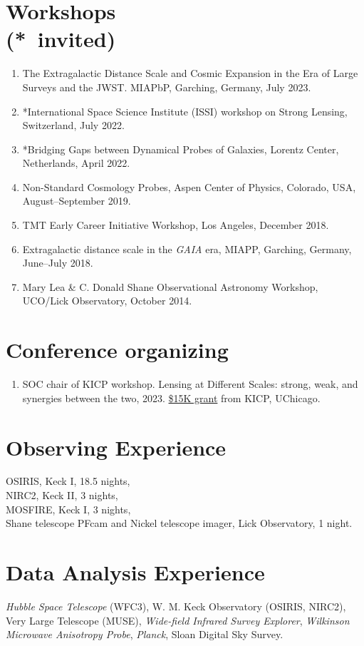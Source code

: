 \documentclass[margin, line]{res}
\begin{document}
\begin{resume}
\section{\sc Workshops \\ ({*}\ invited)}
\begin{enumerate}
	\item The Extragalactic Distance Scale and Cosmic Expansion in the Era of Large Surveys and the JWST. MIAPbP, Garching, Germany, July 2023.
	\item *International Space Science Institute (ISSI) workshop on Strong Lensing, Switzerland, July 2022.
	\item *Bridging Gaps between Dynamical Probes of Galaxies, Lorentz Center, Netherlands, April 2022.
	\item Non-Standard Cosmology Probes, Aspen Center of Physics, Colorado, USA, August--September 2019.
	\item TMT Early Career Initiative Workshop, Los Angeles, December 2018.
	\item Extragalactic distance scale in the \textit{GAIA} era, MIAPP, Garching, Germany, June--July 2018.
	\item Mary Lea \& C. Donald Shane Observational Astronomy Workshop, UCO/Lick Observatory, October 2014.
\end{enumerate}

\section{\sc Conference organizing}
\begin{enumerate}
	\item SOC chair of KICP workshop. Lensing at Different Scales: strong, weak, and synergies between the two, 2023. \underline{\$15K grant} from KICP, UChicago.
\end{enumerate}

\section{\sc Observing Experience}
OSIRIS, Keck I, 18.5 nights,\\
NIRC2, Keck II, 3 nights, \\
MOSFIRE, Keck I, 3 nights, \\
Shane telescope PFcam and Nickel telescope imager, Lick Observatory, 1 night.


\section{\sc Data Analysis Experience}
\textit{Hubble Space Telescope} (WFC3), 
W. M. Keck Observatory (OSIRIS, NIRC2),
Very Large Telescope (MUSE),
{\it Wide-field Infrared Survey Explorer},
{\it Wilkinson Microwave Anisotropy Probe},
{\it Planck},
Sloan Digital Sky Survey.


\end{resume}
\end{document}
